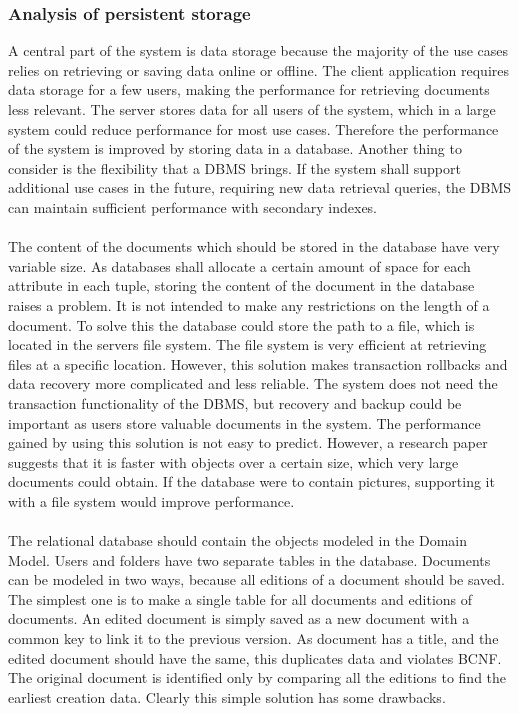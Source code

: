 \documentclass[a4paper,11pt,report]{report}
\begin{document}
		\subsubsection{Analysis of persistent storage}
		A central part of the system is data storage because the majority of the use cases relies on retrieving or saving data online or offline. The client application requires data storage for a few users, making the performance for retrieving documents less relevant. The 			server stores data for all users of the system, which in a large system could reduce performance for most use cases. Therefore the performance of the system is improved by storing data in a database. Another thing to consider is the flexibility that a DBMS brings. If 		the system shall support additional use cases in the future, requiring new data retrieval queries, the DBMS can maintain sufficient performance with secondary indexes. \\ \\
		The content of the documents which should be stored in the database have very variable size. As databases shall allocate a certain amount of space for each attribute in each tuple, storing the content of the document in the database raises a problem. It is not 			intended to make any restrictions on the length of a document. To solve this the database could store the path to a file, which is located in the servers file system. The file system is very efficient at retrieving files at a specific location. However, this solution makes 			transaction rollbacks and data recovery more complicated and less reliable. The system does not need the transaction functionality of the DBMS, but recovery and backup could be important as users store valuable documents in the system. The performance gained 			by using this solution is not easy to predict. However, a research paper\cite{Russel} suggests that it is faster with objects over a certain size, which very large documents could obtain. If the database were to contain pictures, supporting it with a file system 			would improve performance.  \\ \\
		The relational database should contain the objects modeled in the Domain Model. Users and folders have two separate tables in the database. Documents can be modeled in two ways, because all editions of a document should be saved. The simplest one is to make a 		single table for all documents and editions of documents. An edited document is simply saved as a new document with a common key to link it to the previous version. As document has a title, and the edited document should have the same, this duplicates data and 			violates BCNF. The original document is identified only by comparing all the editions to find the earliest creation data. Clearly this simple solution has some drawbacks. \\ \\
\end{document}
